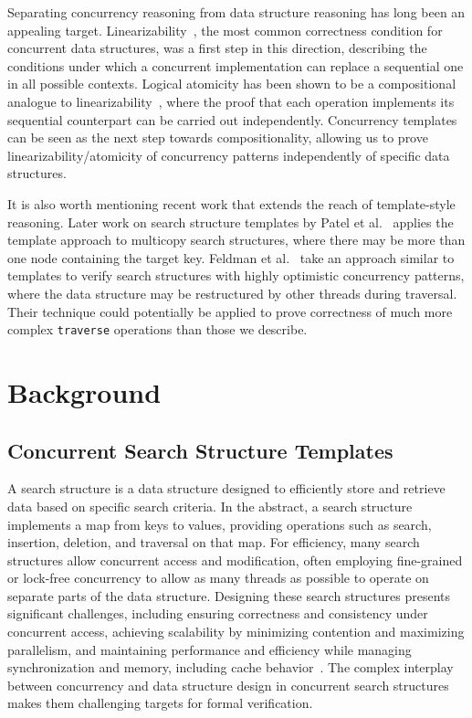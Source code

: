 \documentclass[sigplan,10pt,anonymous,review]{acmart}\settopmatter{printfolios=true,printccs=false,printacmref=false}
\begin{document}
Separating concurrency reasoning from data structure reasoning has long been an appealing target. Linearizability~\cite{linearizability}, the most common correctness condition for concurrent data structures, was a first step in this direction, describing the conditions under which a concurrent implementation can replace a sequential one in all possible contexts. Logical atomicity has been shown to be a compositional analogue to linearizability~\cite{la-lin}, where the proof that each operation implements its sequential counterpart can be carried out independently. Concurrency templates can be seen as the next step towards compositionality, allowing us to prove linearizability/atomicity of concurrency patterns independently of specific data structures.


It is also worth mentioning recent work that extends the reach of template-style reasoning. Later work on search structure templates by Patel et al.~\cite{template-multi} applies the template approach to multicopy search structures, where there may be more than one node containing the target key. Feldman et al.~\cite{feldman2020proving} take an approach similar to templates to verify search structures with highly optimistic concurrency patterns, where the data structure may be restructured by other threads during traversal. Their technique could potentially be applied to prove correctness of much more complex \lstinline{traverse} operations than those we describe.

\section{Background}
\subsection{Concurrent Search Structure Templates}

A search structure is a data structure designed to efficiently store and retrieve data based on specific search criteria. In the abstract, a search structure implements a map from keys to values, providing operations such as search, insertion, deletion, and traversal on that map. For efficiency, many search structures allow concurrent access and modification, often employing fine-grained or lock-free concurrency to allow as many threads as possible to operate on separate parts of the data structure. Designing these search structures presents significant challenges, including ensuring correctness and consistency under concurrent access, achieving scalability by minimizing contention and maximizing parallelism, and maintaining performance and efficiency while managing synchronization and memory, including cache behavior~\cite{masstree}. The complex interplay between concurrency and data structure design in concurrent search structures makes them challenging targets for formal verification.
\end{document}
